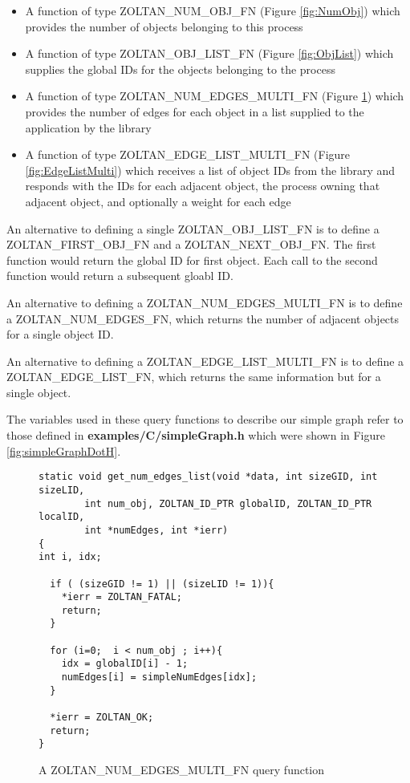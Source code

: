\begin{itemize}
\item A function of type ZOLTAN\_NUM\_OBJ\_FN (Figure \ref{fig:NumObj}) which provides the number of objects belonging to this process 
\item A function of type ZOLTAN\_OBJ\_LIST\_FN (Figure \ref{fig:ObjList}) which supplies the global IDs for the objects belonging to the process
\item A function of type ZOLTAN\_NUM\_EDGES\_MULTI\_FN (Figure \ref{fig:NumEdges}) which provides the number of edges for each object in a list supplied to the application by the library
\item A function of type ZOLTAN\_EDGE\_LIST\_MULTI\_FN (Figure \ref{fig:EdgeListMulti})
which receives a list of object IDs from the library and responds with the IDs for
each adjacent object, the process owning that adjacent object, and optionally a weight
for each edge
\end{itemize}

An alternative to defining a single ZOLTAN\_OBJ\_LIST\_FN is to define
a ZOLTAN\_FIRST\_OBJ\_FN and a ZOLTAN\_NEXT\_OBJ\_FN.  The first function
would return the global ID for first object.  Each call to the second function would
return a subsequent gloabl ID.

An alternative to defining a ZOLTAN\_NUM\_EDGES\_MULTI\_FN is to 
define a ZOLTAN\_NUM\_EDGES\_FN, which returns the number of adjacent
objects for a single object ID.

An alternative to defining a ZOLTAN\_EDGE\_LIST\_MULTI\_FN is to 
define a ZOLTAN\_EDGE\_LIST\_FN, which
returns the same information but for a single object.

The variables used in these query functions to describe our simple graph
refer to those defined in \textbf{examples/C/simpleGraph.h} which were shown in
Figure \ref{fig:simpleGraphDotH}.

\begin{figure}
\begin{flushleft}
\begin{verbatim}
static void get_num_edges_list(void *data, int sizeGID, int sizeLID,
        int num_obj, ZOLTAN_ID_PTR globalID, ZOLTAN_ID_PTR localID,
        int *numEdges, int *ierr)
{
int i, idx;

  if ( (sizeGID != 1) || (sizeLID != 1)){
    *ierr = ZOLTAN_FATAL;
    return;
  }

  for (i=0;  i < num_obj ; i++){
    idx = globalID[i] - 1;
    numEdges[i] = simpleNumEdges[idx];
  }

  *ierr = ZOLTAN_OK;
  return;
}
\end{verbatim}
\end{flushleft}
\caption{A ZOLTAN\_NUM\_EDGES\_MULTI\_FN query function}
\label{fig:NumEdges}
\end{figure}

